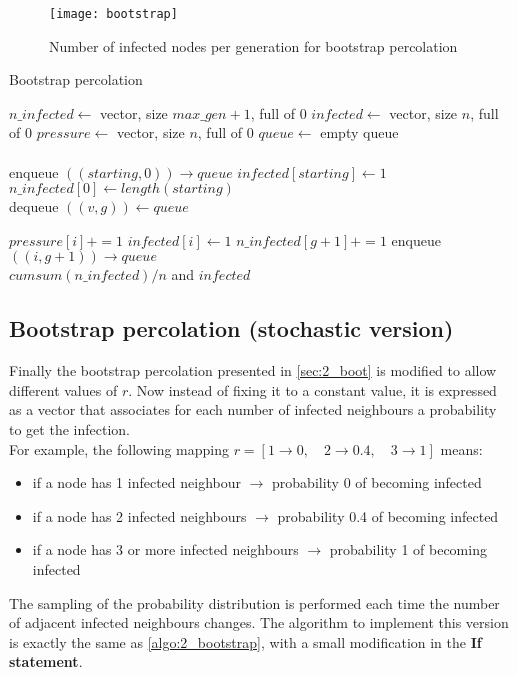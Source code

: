 \begin{figure} [H]
	\centering
	\texttt{[image: bootstrap]}
	\caption{Number of infected nodes per generation for bootstrap percolation}
	\label{fig:2_bootstrap}
\end{figure}

\begin{algorithm}[H]
	\caption{Bootstrap percolation}
	\label{algo:2_bootstrap}
	\begin{algorithmic}[1]
		
		\State $n\_infected \gets$ vector, size $max\_gen+1$, full of $0$
		\State $infected \gets$ vector, size $n$, full of $0$
		\State $pressure \gets$ vector, size $n$, full of $0$
		\State $queue \gets$ empty queue\\
		\\
		
		
		\State enqueue $((starting, 0)) \to queue$
		\State $infected[starting] \gets 1$
		\State $n\_infected[0] \gets length(starting)$	
		\\
		\State dequeue $((v,g)) \gets queue$
		
		\State $pressure[i] +=1$
		\State $infected[i] \gets 1$
		\State $n\_infected[g+1]+=1$				
		\State enqueue $((i, g+1)) \to queue$
		\EndIf
		\EndFor
		\EndWhile
		\\	
		\State \Return $cumsum(n\_infected)/n$ and $infected$
		\EndFunction
	\end{algorithmic}
\end{algorithm}
\pagebreak

\subsection{Bootstrap percolation (stochastic version)}
Finally the bootstrap percolation presented in \cref{sec:2_boot} is modified to allow different values of $r$. Now instead of fixing it to a constant value, it is expressed as a vector that associates for each number of infected neighbours a probability to get the infection.\\ For example, the following mapping $r=[1 \to 0,\quad 2 \to 0.4,\quad 3 \to 1]$ means:
\begin{itemize}
	\item if a node has 1 infected neighbour $\rightarrow$ probability 0 of becoming infected
	\item if a node has 2 infected neighbours $\rightarrow$ probability 0.4 of becoming infected
	\item if a node has 3 or more infected neighbours $\rightarrow$ probability 1 of becoming infected
\end{itemize}
The sampling of the probability distribution is performed each time the number of adjacent infected neighbours changes. The algorithm to implement this version is exactly the same as \cref{algo:2_bootstrap}, with a small modification in the \textbf{If statement}.

